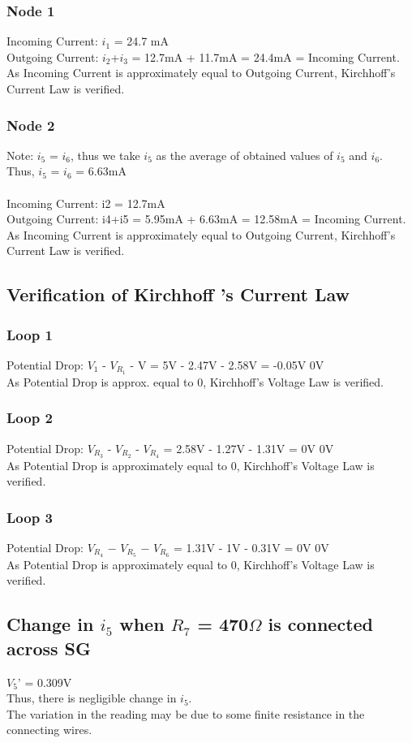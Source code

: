 \documentclass{article}
\begin{document}
\subsubsection{Node 1}
Incoming Current: $i_1$ = 24.7 mA \\
Outgoing Current: $i_2$+$i_3$ = 12.7mA + 11.7mA = 24.4mA =  Incoming Current. \\
As Incoming Current is approximately equal to Outgoing Current, Kirchhoff’s Current Law is verified.

\subsubsection{Node 2}
Note: $i_5$ = $i_6$, thus we take $i_5$ as the average of obtained values of $i_5$ and $i_6$. \\
Thus, $i_5$ = $i_6$ = 6.63mA \\
\\
Incoming Current: i2 = 12.7mA \\
Outgoing Current: i4+i5 = 5.95mA + 6.63mA = 12.58mA = Incoming Current. \\
As Incoming Current is approximately equal to Outgoing Current, Kirchhoff’s Current Law is verified.
\subsection{Verification of Kirchhoff ’s Current Law}
\subsubsection{Loop 1}
Potential Drop: $V_1$ - $V_{R_1}$ - V = 5V - 2.47V - 2.58V = -0.05V \approx 0V \\
As Potential Drop is approx. equal to 0, Kirchhoff’s Voltage Law is verified.
\subsubsection{Loop 2}
Potential Drop: $V_{R_3}$ - $V_{R_2}$ - $V_{R_4}$ = 2.58V - 1.27V - 1.31V = 0V \approx 0V \\
As Potential Drop is approximately equal to 0, Kirchhoff’s Voltage Law is verified.
\subsubsection{Loop 3}
Potential Drop: $V_{R_4}$ − $V_{R_5}$ − $V_{R_6}$ = 1.31V - 1V - 0.31V = 0V \approx 0V \\
As Potential Drop is approximately equal to 0, Kirchhoff’s Voltage Law is verified.

\subsection{Change in $i_5$ when $R_7$ = 470$\Omega$ is connected across SG}
$V_5$' = 0.309V\\
\therefore Thus, there is negligible change in $i_5$. \\
The variation in the reading may be due to some finite resistance in the connecting
wires.
\end{document}
